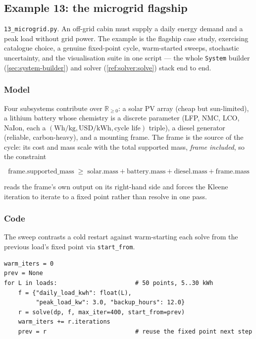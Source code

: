 \documentclass[11pt,a4paper]{article}
\newcommand{\Rplus}{\mathbb{R}_{\geq 0}}
\begin{document}
\subsection{Example 13: the microgrid flagship}
\label{ex:13}

\texttt{13\_microgrid.py}. An off-grid cabin must supply a daily energy
demand and a peak load without grid power. The example is the flagship
case study, exercising catalogue choice, a genuine fixed-point cycle,
warm-started sweeps, stochastic uncertainty, and the visualisation
suite in one script --- the whole \texttt{System} builder
(\ref{sec:system-builder}) and solver (\ref{ref:solver:solve}) stack
end to end.

\subsubsection*{Model}

Four subsystems contribute over $\Rplus$: a solar PV array (cheap but
sun-limited), a lithium battery whose chemistry is a discrete parameter
(LFP, NMC, LCO, NaIon, each a $(\text{Wh/kg}, \text{USD/kWh}, \text{cycle
life})$ triple), a diesel generator (reliable, carbon-heavy), and a
mounting frame. The frame is the source of the cycle: its cost and mass
scale with the total supported mass, \emph{frame included}, so the
constraint

\[
\text{frame.supported\_mass} \;\ge\;
  \text{solar.mass} + \text{battery.mass}
  + \text{diesel.mass} + \text{frame.mass}
\]

reads the frame's own output on its right-hand side and forces the
Kleene iteration to iterate to a fixed point rather than resolve in one
pass.

\subsubsection*{Code}

The sweep contrasts a cold restart against warm-starting each solve
from the previous load's fixed point via \texttt{start\_from}.

\begin{lstlisting}
warm_iters = 0
prev = None
for L in loads:                      # 50 points, 5..30 kWh
    f = {"daily_load_kwh": float(L),
         "peak_load_kw": 3.0, "backup_hours": 12.0}
    r = solve(dp, f, max_iter=400, start_from=prev)
    warm_iters += r.iterations
    prev = r                         # reuse the fixed point next step
\end{lstlisting}
\end{document}
